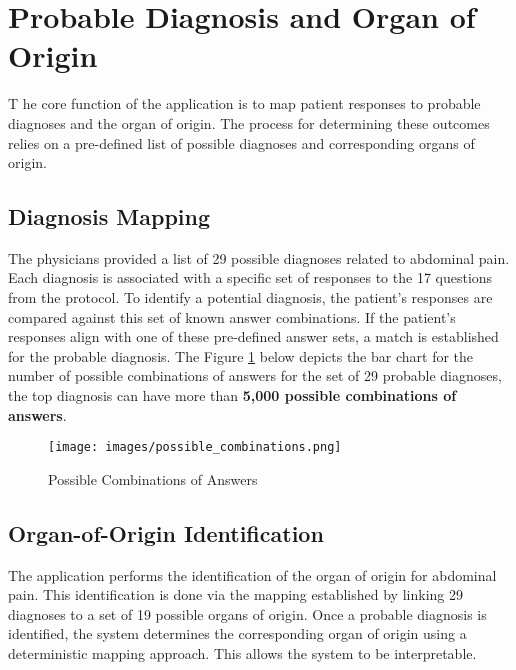 \section{Probable Diagnosis and Organ of Origin}
\lettrine{T}{ }he core function of the application is to map patient responses to probable diagnoses and the organ of origin. The process for determining these outcomes relies on a pre-defined list of possible diagnoses and corresponding organs of origin.

\subsection{Diagnosis Mapping}
The physicians provided a list of 29 possible diagnoses related to abdominal pain. Each diagnosis is associated with a specific set of responses to the 17 questions from the protocol. To identify a potential diagnosis, the patient's responses are compared against this set of known answer combinations. If the patient's responses align with one of these pre-defined answer sets, a match is established for the probable diagnosis. The Figure \ref{fig:possible_combinations} below depicts the bar chart for the number of possible combinations of answers for the set of 29 probable diagnoses, the top diagnosis can have more than \textcolor{TUMRed}{\textbf{5,000 possible combinations of answers}}.
\begin{figure}[H]
    \centering
    \texttt{[image: images/possible\_combinations.png]}
    \caption{Possible Combinations of Answers}
    \label{fig:possible_combinations}
\end{figure}

\subsection{Organ-of-Origin Identification}
The application performs the identification of the organ of origin for abdominal pain. This identification is done via the mapping established by linking 29 diagnoses to a set of 19 possible organs of origin. Once a probable diagnosis is identified, the system determines the corresponding organ of origin using a \textcolor{TUMBlue}{deterministic mapping} approach. This allows the system to be interpretable.\\[\baselineskip]

